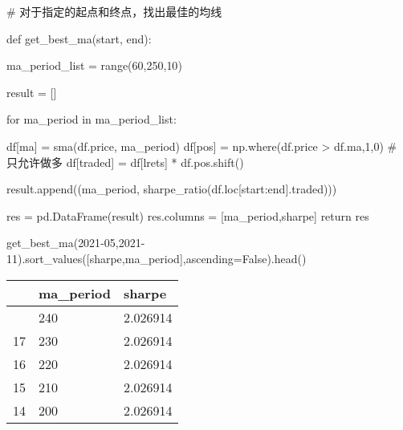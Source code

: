 \documentclass[
  letterpaper,
  DIV=11,
  numbers=noendperiod]{scrreprt}
\newenvironment{Shaded}{\begin{snugshade}}{\end{snugshade}}
\newcommand{\BuiltInTok}[1]{\textcolor[rgb]{0.00,0.23,0.31}{#1}}
\newcommand{\CommentTok}[1]{\textcolor[rgb]{0.37,0.37,0.37}{#1}}
\newcommand{\ControlFlowTok}[1]{\textcolor[rgb]{0.00,0.23,0.31}{#1}}
\newcommand{\DecValTok}[1]{\textcolor[rgb]{0.68,0.00,0.00}{#1}}
\newcommand{\KeywordTok}[1]{\textcolor[rgb]{0.00,0.23,0.31}{#1}}
\newcommand{\NormalTok}[1]{\textcolor[rgb]{0.00,0.23,0.31}{#1}}
\newcommand{\OperatorTok}[1]{\textcolor[rgb]{0.37,0.37,0.37}{#1}}
\newcommand{\StringTok}[1]{\textcolor[rgb]{0.13,0.47,0.30}{#1}}
\newcommand{\VariableTok}[1]{\textcolor[rgb]{0.07,0.07,0.07}{#1}}
\begin{document}
\begin{Shaded}
\begin{Highlighting}[]
\CommentTok{\# 对于指定的起点和终点，找出最佳的均线}

\KeywordTok{def}\NormalTok{ get\_best\_ma(start, end):}
    
\NormalTok{    ma\_period\_list }\OperatorTok{=} \BuiltInTok{range}\NormalTok{(}\DecValTok{60}\NormalTok{,}\DecValTok{250}\NormalTok{,}\DecValTok{10}\NormalTok{)}

\NormalTok{    result }\OperatorTok{=}\NormalTok{ []}

    \ControlFlowTok{for}\NormalTok{ ma\_period }\KeywordTok{in}\NormalTok{ ma\_period\_list:}

\NormalTok{        df[}\StringTok{\textquotesingle{}ma\textquotesingle{}}\NormalTok{] }\OperatorTok{=}\NormalTok{ sma(df.price, ma\_period)}
\NormalTok{        df[}\StringTok{\textquotesingle{}pos\textquotesingle{}}\NormalTok{] }\OperatorTok{=}\NormalTok{ np.where(df.price }\OperatorTok{\textgreater{}}\NormalTok{ df.ma,}\DecValTok{1}\NormalTok{,}\DecValTok{0}\NormalTok{) }\CommentTok{\# 只允许做多}
\NormalTok{        df[}\StringTok{\textquotesingle{}traded\textquotesingle{}}\NormalTok{] }\OperatorTok{=}\NormalTok{ df[}\StringTok{\textquotesingle{}lrets\textquotesingle{}}\NormalTok{] }\OperatorTok{*}\NormalTok{ df.pos.shift() }

\NormalTok{        result.append((ma\_period, sharpe\_ratio(df.loc[start:end].traded)))}

\NormalTok{    res }\OperatorTok{=}\NormalTok{ pd.DataFrame(result)}
\NormalTok{    res.columns }\OperatorTok{=}\NormalTok{ [}\StringTok{\textquotesingle{}ma\_period\textquotesingle{}}\NormalTok{,}\StringTok{\textquotesingle{}sharpe\textquotesingle{}}\NormalTok{]}
    \ControlFlowTok{return}\NormalTok{ res}

\NormalTok{get\_best\_ma(}\StringTok{\textquotesingle{}2021{-}05\textquotesingle{}}\NormalTok{,}\StringTok{\textquotesingle{}2021{-}11\textquotesingle{}}\NormalTok{).sort\_values([}\StringTok{\textquotesingle{}sharpe\textquotesingle{}}\NormalTok{,}\StringTok{\textquotesingle{}ma\_period\textquotesingle{}}\NormalTok{],ascending}\OperatorTok{=}\VariableTok{False}\NormalTok{).head()}
\end{Highlighting}
\end{Shaded}

\begin{longtable}[]{@{}lll@{}}
\toprule\noalign{}
& ma\_period & sharpe \\
\midrule\noalign{}
\endhead
\bottomrule\noalign{}
\endlastfoot
18 & 240 & 2.026914 \\
17 & 230 & 2.026914 \\
16 & 220 & 2.026914 \\
15 & 210 & 2.026914 \\
14 & 200 & 2.026914 \\
\end{longtable}
\end{document}
